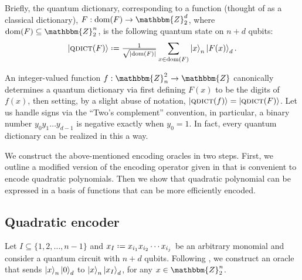 \documentclass[reqno,oneside,12pt]{amsart}  %
\numberwithin{equation}{section}                %
\let\originalleft\left
\let\originalright\right
\renewcommand{\left}{\mathopen{}\mathclose\bgroup\originalleft}
\renewcommand{\right}{\aftergroup\egroup\originalright}
\def\({\mathopen{}\left(}
\def\){\right)\mathclose{}}
\newcommand*{\eqdef}{\mathrel{\vcenter{\baselineskip0.5ex \lineskiplimit0pt\hbox{.}\hbox{.}}}=}
\def\Z{\mathbbm{Z}}
\def\dom{\mathrm{dom}}
\def\qdict{\textsc{qdict}}
\begin{document}
Briefly, the quantum dictionary, corresponding to a function (thought of as a classical dictionary), $F: \dom \( F \) \rightarrow \Z_2^d$, where $\dom \( F \) \subseteq \Z_2^n$, is the following quantum state on $n + d$ qubits:
\begin{equation}
   \ket{\qdict \( F \)} \eqdef \tfrac{1}{\sqrt{\left| \dom \( F \) \right|}} \sum\limits_{x \in \dom \( F \)} \ket{x}_n \ket{F (x)}_d.
\end{equation}

An integer-valued function $f : \Z_n^2 \rightarrow \Z$ canonically determines a quantum dictionary via first defining $F (x)$ to be the digits of $f (x)$, then setting, by a slight abuse of notation, $\ket{\qdict \( f \)} = \ket{\qdict \( F \)}$. Let us handle signs via the ``Two's complement'' convention, in particular, a binary number $y_0 y_1 \ldots y_{d - 1}$ is negative exactly when $y_0 = 1$. In fact, every quantum dictionary can be realized in this a way.

\smallskip

We construct the above-mentioned encoding oracles in two steps. First, we outline a modified version of the encoding operator given in \cite{gilliam_grover_2021} that is convenient to encode quadratic polynomials. Then we show that quadratic polynomial can be expressed in a basis of functions that can be more efficiently encoded.

\medskip

\subsection{Quadratic encoder}
\label{sec:quad}

Let $I \subseteq \{ 1, 2, \ldots, n - 1 \}$ and $x_I \eqdef x_{i_1} x_{i_2} \cdots x_{i_j}$ be an arbitrary monomial and consider a quantum circuit with $n + d$ qubits. Following \cite{gilliam_grover_2021}, we construct an oracle that sends $\ket{x}_n \ket{0}_d$ to $\ket{x}_n \ket{x_I}_d$, for any $x \in \Z_2^n$.
\end{document}
